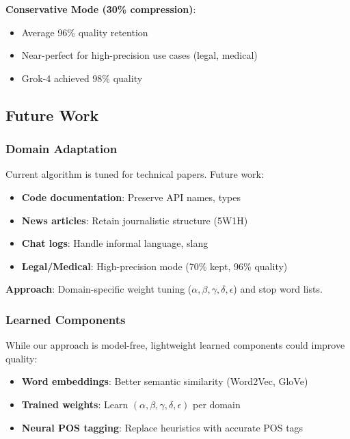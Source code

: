 \textbf{Conservative Mode (30\% compression)}:
\begin{itemize}
    \item Average 96\% quality retention
    \item Near-perfect for high-precision use cases (legal, medical)
    \item Grok-4 achieved 98\% quality
\end{itemize}

\subsection{Future Work}

\subsubsection{Domain Adaptation}

Current algorithm is tuned for technical papers. Future work:

\begin{itemize}
    \item \textbf{Code documentation}: Preserve API names, types
    \item \textbf{News articles}: Retain journalistic structure (5W1H)
    \item \textbf{Chat logs}: Handle informal language, slang
    \item \textbf{Legal/Medical}: High-precision mode (70\% kept, 96\% quality)
\end{itemize}

\textbf{Approach}: Domain-specific weight tuning ($\alpha, \beta, \gamma, \delta, \epsilon$) and stop word lists.

\subsubsection{Learned Components}

While our approach is model-free, lightweight learned components could improve quality:

\begin{itemize}
    \item \textbf{Word embeddings}: Better semantic similarity (Word2Vec, GloVe)
    \item \textbf{Trained weights}: Learn $(\alpha, \beta, \gamma, \delta, \epsilon)$ per domain
    \item \textbf{Neural POS tagging}: Replace heuristics with accurate POS tags
\end{itemize}

